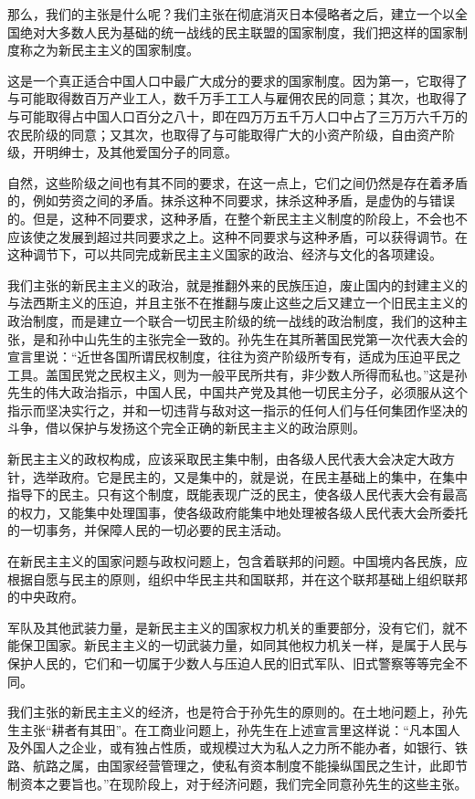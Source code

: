 那么，我们的主张是什么呢？我们主张在彻底消灭日本侵略者之后，建立一个以全国绝对大多数人民为基础的统一战线的民主联盟的国家制度，我们把这样的国家制度称之为新民主主义的国家制度。

这是一个真正适合中国人口中最广大成分的要求的国家制度。因为第一，它取得了与可能取得数百万产业工人，数千万手工工人与雇佣农民的同意；其次，也取得了与可能取得占中国人口百分之八十，即在四万万五千万人口中占了三万万六千万的农民阶级的同意；又其次，也取得了与可能取得广大的小资产阶级，自由资产阶级，开明绅士，及其他爱国分子的同意。

自然，这些阶级之间也有其不同的要求，在这一点上，它们之间仍然是存在着矛盾的，例如劳资之间的矛盾。抹杀这种不同要求，抹杀这种矛盾，是虚伪的与错误的。但是，这种不同要求，这种矛盾，在整个新民主主义制度的阶段上，不会也不应该使之发展到超过共同要求之上。这种不同要求与这种矛盾，可以获得调节。在这种调节下，可以共同完成新民主主义国家的政治、经济与文化的各项建设。

我们主张的新民主主义的政治，就是推翻外来的民族压迫，废止国内的封建主义的与法西斯主义的压迫，并且主张不在推翻与废止这些之后又建立一个旧民主主义的政治制度，而是建立一个联合一切民主阶级的统一战线的政治制度，我们的这种主张，是和孙中山先生的主张完全一致的。孙先生在其所著国民党第一次代表大会的宣言里说：“近世各国所谓民权制度，往往为资产阶级所专有，适成为压迫平民之工具。盖国民党之民权主义，则为一般平民所共有，非少数人所得而私也。”这是孙先生的伟大政治指示，中国人民，中国共产党及其他一切民主分子，必须服从这个指示而坚决实行之，并和一切违背与敌对这一指示的任何人们与任何集团作坚决的斗争，借以保护与发扬这个完全正确的新民主主义的政治原则。

新民主主义的政权构成，应该采取民主集中制，由各级人民代表大会决定大政方针，选举政府。它是民主的，又是集中的，就是说，在民主基础上的集中，在集中指导下的民主。只有这个制度，既能表现广泛的民主，使各级人民代表大会有最高的权力，又能集中处理国事，使各级政府能集中地处理被各级人民代表大会所委托的一切事务，并保障人民的一切必要的民主活动。

在新民主主义的国家问题与政权问题上，包含着联邦的问题。中国境内各民族，应根据自愿与民主的原则，组织中华民主共和国联邦，并在这个联邦基础上组织联邦的中央政府。

军队及其他武装力量，是新民主主义的国家权力机关的重要部分，没有它们，就不能保卫国家。新民主主义的一切武装力量，如同其他权力机关一样，是属于人民与保护人民的，它们和一切属于少数人与压迫人民的旧式军队、旧式警察等等完全不同。

我们主张的新民主主义的经济，也是符合于孙先生的原则的。在土地问题上，孙先生主张“耕者有其田”。在工商业问题上，孙先生在上述宣言里这样说：“凡本国人及外国人之企业，或有独占性质，或规模过大为私人之力所不能办者，如银行、铁路、航路之属，由国家经营管理之，使私有资本制度不能操纵国民之生计，此即节制资本之要旨也。”在现阶段上，对于经济问题，我们完全同意孙先生的这些主张。

